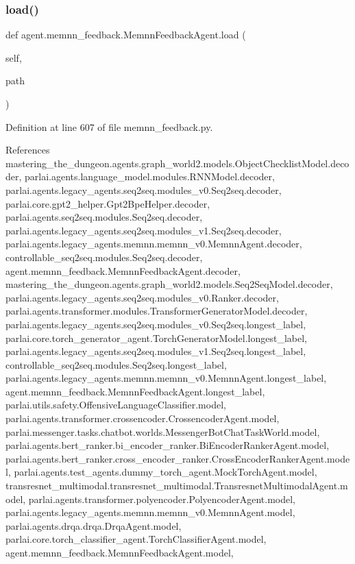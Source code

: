 \subsubsection{\texorpdfstring{load()}{load()}}
{\footnotesize\ttfamily def agent.\+memnn\+\_\+feedback.\+Memnn\+Feedback\+Agent.\+load (\begin{DoxyParamCaption}\item[{}]{self,  }\item[{}]{path }\end{DoxyParamCaption})}



Definition at line 607 of file memnn\+\_\+feedback.\+py.



References mastering\+\_\+the\+\_\+dungeon.\+agents.\+graph\+\_\+world2.\+models.\+Object\+Checklist\+Model.\+decoder, parlai.\+agents.\+language\+\_\+model.\+modules.\+R\+N\+N\+Model.\+decoder, parlai.\+agents.\+legacy\+\_\+agents.\+seq2seq.\+modules\+\_\+v0.\+Seq2seq.\+decoder, parlai.\+core.\+gpt2\+\_\+helper.\+Gpt2\+Bpe\+Helper.\+decoder, parlai.\+agents.\+seq2seq.\+modules.\+Seq2seq.\+decoder, parlai.\+agents.\+legacy\+\_\+agents.\+seq2seq.\+modules\+\_\+v1.\+Seq2seq.\+decoder, parlai.\+agents.\+legacy\+\_\+agents.\+memnn.\+memnn\+\_\+v0.\+Memnn\+Agent.\+decoder, controllable\+\_\+seq2seq.\+modules.\+Seq2seq.\+decoder, agent.\+memnn\+\_\+feedback.\+Memnn\+Feedback\+Agent.\+decoder, mastering\+\_\+the\+\_\+dungeon.\+agents.\+graph\+\_\+world2.\+models.\+Seq2\+Seq\+Model.\+decoder, parlai.\+agents.\+legacy\+\_\+agents.\+seq2seq.\+modules\+\_\+v0.\+Ranker.\+decoder, parlai.\+agents.\+transformer.\+modules.\+Transformer\+Generator\+Model.\+decoder, parlai.\+agents.\+legacy\+\_\+agents.\+seq2seq.\+modules\+\_\+v0.\+Seq2seq.\+longest\+\_\+label, parlai.\+core.\+torch\+\_\+generator\+\_\+agent.\+Torch\+Generator\+Model.\+longest\+\_\+label, parlai.\+agents.\+legacy\+\_\+agents.\+seq2seq.\+modules\+\_\+v1.\+Seq2seq.\+longest\+\_\+label, controllable\+\_\+seq2seq.\+modules.\+Seq2seq.\+longest\+\_\+label, parlai.\+agents.\+legacy\+\_\+agents.\+memnn.\+memnn\+\_\+v0.\+Memnn\+Agent.\+longest\+\_\+label, agent.\+memnn\+\_\+feedback.\+Memnn\+Feedback\+Agent.\+longest\+\_\+label, parlai.\+utils.\+safety.\+Offensive\+Language\+Classifier.\+model, parlai.\+agents.\+transformer.\+crossencoder.\+Crossencoder\+Agent.\+model, parlai.\+messenger.\+tasks.\+chatbot.\+worlds.\+Messenger\+Bot\+Chat\+Task\+World.\+model, parlai.\+agents.\+bert\+\_\+ranker.\+bi\+\_\+encoder\+\_\+ranker.\+Bi\+Encoder\+Ranker\+Agent.\+model, parlai.\+agents.\+bert\+\_\+ranker.\+cross\+\_\+encoder\+\_\+ranker.\+Cross\+Encoder\+Ranker\+Agent.\+model, parlai.\+agents.\+test\+\_\+agents.\+dummy\+\_\+torch\+\_\+agent.\+Mock\+Torch\+Agent.\+model, transresnet\+\_\+multimodal.\+transresnet\+\_\+multimodal.\+Transresnet\+Multimodal\+Agent.\+model, parlai.\+agents.\+transformer.\+polyencoder.\+Polyencoder\+Agent.\+model, parlai.\+agents.\+legacy\+\_\+agents.\+memnn.\+memnn\+\_\+v0.\+Memnn\+Agent.\+model, parlai.\+agents.\+drqa.\+drqa.\+Drqa\+Agent.\+model, parlai.\+core.\+torch\+\_\+classifier\+\_\+agent.\+Torch\+Classifier\+Agent.\+model, agent.\+memnn\+\_\+feedback.\+Memnn\+Feedback\+Agent.\+model, 